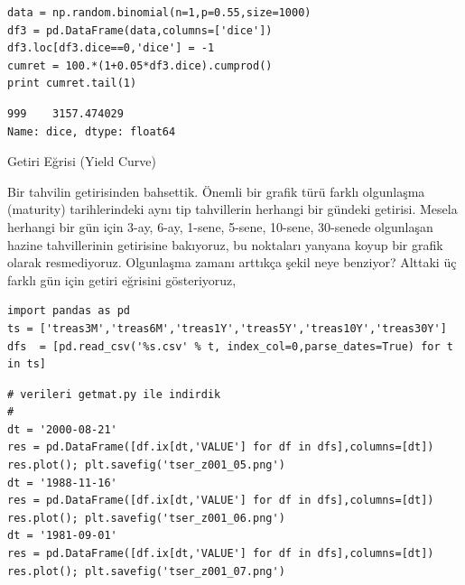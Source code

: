 \documentclass[12pt,fleqn]{article}\usepackage{../../common}
\begin{document}
\begin{verbatim}
data = np.random.binomial(n=1,p=0.55,size=1000)
df3 = pd.DataFrame(data,columns=['dice'])
df3.loc[df3.dice==0,'dice'] = -1
cumret = 100.*(1+0.05*df3.dice).cumprod()
print cumret.tail(1)
\end{verbatim}

\begin{verbatim}
999    3157.474029
Name: dice, dtype: float64
\end{verbatim}

\newpage

Getiri Eğrisi (Yield Curve)

Bir tahvilin getirisinden bahsettik. Önemli bir grafik türü farklı olgunlaşma
(maturity) tarihlerindeki aynı tip tahvillerin herhangi bir gündeki
getirisi. Mesela herhangi bir gün için 3-ay, 6-ay, 1-sene, 5-sene, 10-sene,
30-senede olgunlaşan hazine tahvillerinin getirisine bakıyoruz, bu noktaları
yanyana koyup bir grafik olarak resmediyoruz. Olgunlaşma zamanı arttıkça şekil
neye benziyor? Alttaki üç farklı gün için getiri eğrisini gösteriyoruz,

\begin{verbatim}
import pandas as pd  
ts = ['treas3M','treas6M','treas1Y','treas5Y','treas10Y','treas30Y']
dfs  = [pd.read_csv('%s.csv' % t, index_col=0,parse_dates=True) for t in ts]
\end{verbatim}

\begin{verbatim}
# verileri getmat.py ile indirdik
#
dt = '2000-08-21'
res = pd.DataFrame([df.ix[dt,'VALUE'] for df in dfs],columns=[dt])
res.plot(); plt.savefig('tser_z001_05.png')
dt = '1988-11-16'
res = pd.DataFrame([df.ix[dt,'VALUE'] for df in dfs],columns=[dt])
res.plot(); plt.savefig('tser_z001_06.png')
dt = '1981-09-01'
res = pd.DataFrame([df.ix[dt,'VALUE'] for df in dfs],columns=[dt])
res.plot(); plt.savefig('tser_z001_07.png')
\end{verbatim}
\end{document}
